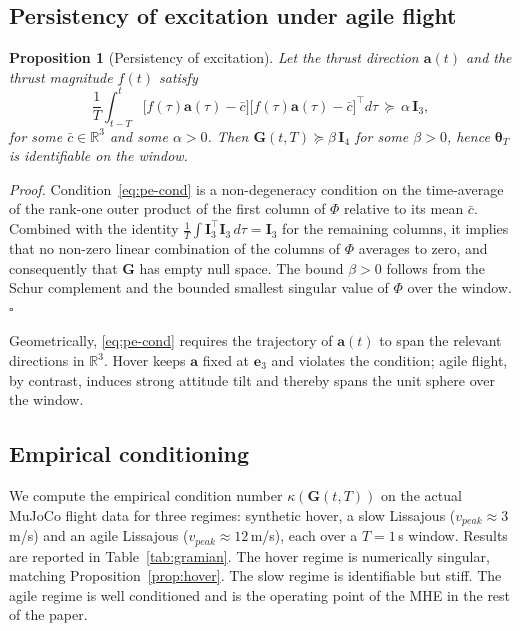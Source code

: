 \documentclass[lettersize,journal]{IEEEtran}
\newtheorem{proposition}{Proposition}
\renewenvironment{proof}{\noindent\textit{Proof.}}{\hfill$\square$\medskip}
\newcommand{\R}{\mathbb{R}}
\newcommand{\vect}[1]{\bm{#1}}
\newcommand{\mat}[1]{\mathbf{#1}}
\begin{document}
\subsection{Persistency of excitation under agile flight}
\begin{proposition}[Persistency of excitation]\label{prop:pe}
Let the thrust direction $\vect a(t)$ and the thrust magnitude
$f(t)$ satisfy
\begin{equation}
\frac{1}{T}\!\int_{t-T}^{t}\!\big[f(\tau)\vect a(\tau)-\bar c\big]\!\big[f(\tau)\vect a(\tau)-\bar c\big]^{\!\top} d\tau \,\succeq\, \alpha\,\mat I_3,
\label{eq:pe-cond}
\end{equation}
for some $\bar c\in\R^3$ and some $\alpha>0$.  Then
$\mat G(t,T)\succeq \beta\,\mat I_4$ for some $\beta>0$, hence
$\vect\theta_T$ is identifiable on the window.
\end{proposition}
\begin{proof}
Condition~\eqref{eq:pe-cond} is a non-degeneracy condition on
the time-average of the rank-one outer product of the first
column of $\Phi$ relative to its mean $\bar c$.  Combined with
the identity
$\frac{1}{T}\int\mat I_3^\top\mat I_3\,d\tau=\mat I_3$ for the
remaining columns, it implies that no non-zero linear
combination of the columns of $\Phi$ averages to zero, and
consequently that $\mat G$ has empty null space.  The bound
$\beta>0$ follows from the Schur complement and the bounded
smallest singular value of $\Phi$ over the window.
\end{proof}

\noindent Geometrically, \eqref{eq:pe-cond} requires the
trajectory of $\vect a(t)$ to span the relevant directions in
$\R^3$.  Hover keeps $\vect a$ fixed at $\vect e_3$ and violates
the condition; agile flight, by contrast, induces strong
attitude tilt and thereby spans the unit sphere over the window.

\subsection{Empirical conditioning}
We compute the empirical condition number $\kappa(\mat G(t,T))$
on the actual MuJoCo flight data for three regimes: synthetic
hover, a slow Lissajous ($v_{peak}\!\approx\!3$\,m/s) and an
agile Lissajous ($v_{peak}\!\approx\!12$\,m/s), each over a
$T=1$\,s window.  Results are reported in
Table~\ref{tab:gramian}.  The hover regime is numerically
singular, matching Proposition~\ref{prop:hover}.  The slow
regime is identifiable but stiff.  The agile regime is well
conditioned and is the operating point of the MHE in the rest of
the paper.
\end{document}
